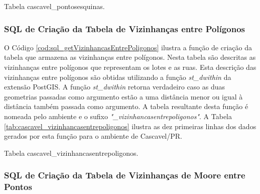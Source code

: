 \begin{table}[H]
\centering
{}
\caption{Tabela cascavel\_pontosesquinas.}
\label{tab:cascavel_pontosesquinas}
\end{table}

\subsubsection{SQL de Criação da Tabela de Vizinhanças entre Polígonos}

O Código \ref{cod:sql_getVizinhancasEntrePoligonos} ilustra a função de criação da tabela que armazena as vizinhanças entre polígonos. Nesta tabela são descritas as vizinhanças entre polígonos que representam os lotes e as ruas. Esta descrição das vizinhanças entre polígonos são obtidas utilizando a função \textit{st\_dwithin} da extensão PostGIS. A função \textit{st\_dwithin} retorna verdadeiro caso as duas geometrias passadas como argumento estão a uma distância menor ou igual à distância também passada como argumento. A tabela resultante desta função é nomeada pelo ambiente e o sufixo \textit{"\_vizinhancasentrepoligonos"}. A Tabela \ref{tab:cascavel_vizinhancasentrepoligonos} ilustra as dez primeiras linhas dos dados gerados por esta função para o ambiente de Cascavel/PR.



\begin{table}[H]
\centering
{}
\caption{Tabela cascavel\_vizinhancasentrepoligonos.}
\label{tab:cascavel_vizinhancasentrepoligonos}
\end{table}

\subsubsection{SQL de Criação da Tabela de Vizinhanças de Moore entre Pontos}

